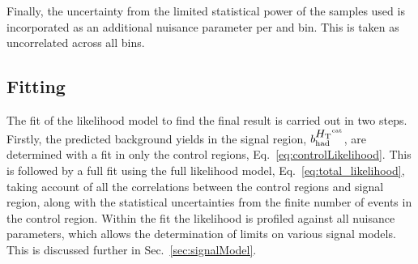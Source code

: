 Finally, the uncertainty from the limited statistical power of the \MC
samples used is incorporated as an additional nuisance parameter per
\htcat and \MHT bin. This is taken as uncorrelated across all bins.

\subsection{Fitting}

The fit of the likelihood model to find the final result is carried
out in two steps. Firstly, the predicted background yields in the
signal region, $b^{\mbox{$H_\text{T}$}^{\text{cat}}}_{\mathrm{had}}$, are determined with a fit
in only the control regions, Eq.~\ref{eq:controlLikelihood}. This is
followed by a full fit using the full likelihood model,
Eq.~\ref{eq:total_likelihood}, taking account of all the correlations
between the control regions and signal region, along with the
statistical uncertainties from the
finite number of events in the control region. Within the fit the
likelihood is profiled against all nuisance parameters, which allows
the determination of limits on various signal models. This is
discussed further in Sec.~\ref{sec:signalModel}.


